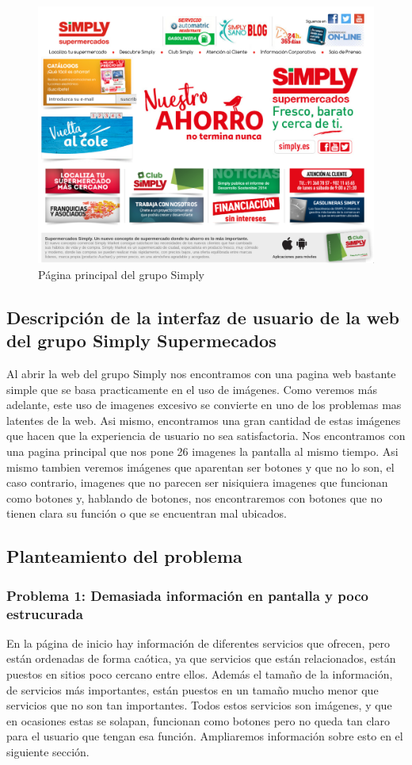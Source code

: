 \documentclass[a4paper,11pt]{article}
\begin{document}
\begin{figure}[h!]
 \centering
 \includegraphics[scale=0.5]{webPrincipal.png}
 \caption{Página principal del grupo Simply}
 \label{fig:pagprin}
\end{figure}

\subsection{Descripción de la interfaz de usuario de la web del grupo Simply Supermecados}
Al abrir la web del grupo Simply nos encontramos con una pagina web bastante simple que se basa practicamente en el uso de imágenes. Como veremos más adelante, este uso de imagenes excesivo se convierte en uno de los problemas mas latentes de la web.
Asi mismo, encontramos una gran cantidad de estas imágenes que hacen que la experiencia de usuario no sea satisfactoria. Nos encontramos con una pagina principal que nos pone 26 imagenes la pantalla al mismo tiempo. Asi mismo tambien veremos imágenes que aparentan ser botones y que no lo son, el caso contrario, imagenes que no parecen ser nisiquiera imagenes que funcionan como botones y, hablando de botones, nos encontraremos con botones que no tienen clara su función o que se encuentran mal ubicados.


\subsection{Planteamiento del problema}
\subsubsection{Problema 1: Demasiada información en pantalla y poco estrucurada}
En la página de inicio hay información de diferentes servicios que ofrecen, pero están ordenadas de forma caótica, ya que servicios que están relacionados, están puestos en sitios poco cercano entre ellos. Además el tamaño de la información, de servicios más importantes, están puestos en un tamaño mucho menor que servicios que no son tan importantes. Todos estos servicios son imágenes, y que en ocasiones estas se solapan,  funcionan como botones pero no queda tan claro para el usuario que tengan esa función. Ampliaremos información sobre esto en el siguiente sección.
\end{document}

